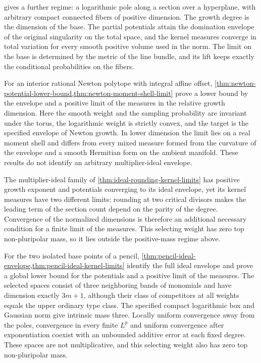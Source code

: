  gives a further regime: a logarithmic pole along a section over a hyperplane, with arbitrary compact connected fibers of positive dimension. The growth degree is the dimension of the base. The partial potentials attain the domination envelope of the original singularity on the total space, and the kernel measures converge in total variation for every smooth positive volume used in the norm. The limit on the base is determined by the metric of the line bundle, and its lift keeps exactly the conditional probabilities on the fibers.

For an interior rational Newton polytope with integral affine offset, \cref{thm:newton-potential-lower-bound,thm:newton-moment-shell-limit} prove a lower bound by the envelope and a positive limit of the measures in the relative growth dimension. Here the smooth weight and the sampling probability are invariant under the torus, the logarithmic weight is strictly convex, and the target is the specified envelope of Newton growth. In lower dimension the limit lies on a real moment shell and differs from every mixed measure formed from the curvature of the envelope and a smooth Hermitian form on the ambient manifold. These results do not identify an arbitrary multiplier-ideal envelope.

The multiplier-ideal family of \cref{thm:ideal-rounding-kernel-limits} has positive growth exponent and potentials converging to its ideal envelope, yet its kernel measures have two different limits: rounding at two critical divisors makes the leading term of the section count depend on the parity of the degree. Convergence of the normalized dimensions is therefore an additional necessary condition for a finite limit of the measures. This selecting weight has zero top non-pluripolar mass, so it lies outside the positive-mass regime above.

For the two isolated base points of a pencil, \cref{thm:pencil-ideal-envelope,thm:pencil-ideal-kernel-limits} identify the full ideal envelope and prove a global lower bound for the potentials and a positive limit of the measures. The selected spaces consist of three neighboring bands of monomials and have dimension exactly $3m+1$, although their class of competitors at all weights equals the upper ordinary type class. The specified compact logarithmic box and Gaussian norm give intrinsic mass three. Locally uniform convergence away from the poles, convergence in every finite $L^p$ and uniform convergence after exponentiation coexist with an unbounded additive error at each fixed degree. These spaces are not multiplicative, and this selecting weight also has zero top non-pluripolar mass.


